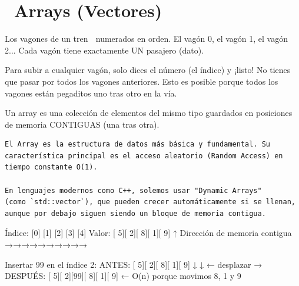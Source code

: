 ﻿\chapter[\emj{📦}~Arrays (Vectores)]{~Arrays (Vectores)}

\begin{dsaquees}

Los vagones de un tren 🚂 numerados en orden. El vagón 0, el vagón 1,
el vagón 2... Cada vagón tiene exactamente UN pasajero (dato).

Para subir a cualquier vagón, solo dices el número (el índice) y 
¡listo! No tienes que pasar por todos los vagones anteriores. 
Esto es posible porque todos los vagones están pegaditos uno tras
otro en la vía.

Un array es una colección de elementos del mismo tipo guardados en 
posiciones de memoria CONTIGUAS (una tras otra).

\end{dsaquees}

\begin{lstlisting}
El Array es la estructura de datos más básica y fundamental. Su
característica principal es el acceso aleatorio (Random Access) en
tiempo constante O(1). 

En lenguajes modernos como C++, solemos usar "Dynamic Arrays" 
(como `std::vector`), que pueden crecer automáticamente si se llenan,
aunque por debajo siguen siendo un bloque de memoria contigua.
\end{lstlisting}

\begin{dsadiagrama}
Índice:  [0] [1] [2] [3] [4]
Valor:   [ 5][ 2][ 8][ 1][ 9]
          ↑
    Dirección de memoria contigua →→→→→→→→→→

Insertar 99 en el índice 2:
ANTES:   [ 5][ 2][ 8][ 1][ 9]
          ↓   ↓   ← desplazar →
DESPUÉS: [ 5][ 2][99][ 8][ 1][ 9]   ← O(n) porque movimos 8, 1 y 9
\end{dsadiagrama}

